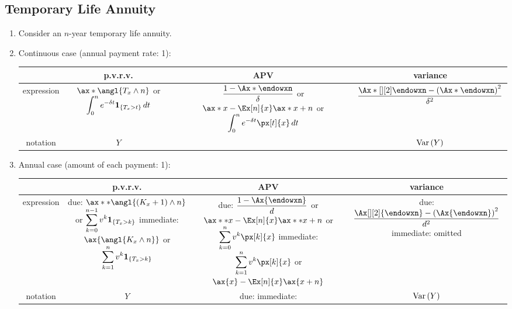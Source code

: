 \subsection{Temporary Life Annuity}
\begin{enumerate}
\item Consider an \(n\)-year temporary life annuity.
\item \label{it:cts-tmp-annuity-fmlas}
Continuous case (annual payment rate: 1):

\begin{tabular}{cccc}
\toprule
&p.v.r.v.&APV&variance\\
\midrule
expression&\(\ax*{\angl{T_x\wedge n}}\) or \(\displaystyle\int_{0}^{n}e^{-\delta t}\mathbf{1}_{\left\{T_x>t\right\}}\,dt\)
&\makecell{\(\displaystyle \frac{1-\Ax*{\endowxn}}{\delta}\) or 
\(\displaystyle \ax*{x}-\Ex[n]{x}\ax*{x+n}\)\\
or \(\displaystyle\int_{0}^{n}e^{-\delta t}\px[t]{x}\,dt\)}
&\(\displaystyle \frac{\Ax*[][2]{\endowxn}-\qty(\Ax*{\endowxn})^2}{\delta^2}\)\\
notation&\(Y\)&{\(\ax*{\endowxn}\)}&\(\operatorname{Var}\qty(Y)\)\\
\bottomrule
\end{tabular}
\item \label{it:ann-tmp-annuity-fmlas}
Annual case (amount of each payment: 1):

\begin{tabular}{cccc}
\toprule
&p.v.r.v.&APV&variance\\
\midrule
expression&
\makecell{
due: \(\ax**{\angl{\qty(K_x+1)\wedge n}}\) or \(\displaystyle\sum_{k=0}^{n-1}v^k\mathbf{1}_{\left\{T_x>k\right\}}\)\\
immediate: \(\ax{\angl{K_x\wedge n}}\) or \(\displaystyle\sum_{k=1}^{n}v^k\mathbf{1}_{\left\{T_x>k\right\}}\)
}
&\makecell{
due: \(\displaystyle \frac{1-\Ax{\endowxn}}{d}\) or \(\ax**{x}-\Ex[n]{x}\ax**{x+n}\) \\
or \(\displaystyle\sum_{k=0}^{n}v^k\px[k]{x}\)\\
immediate: \(\displaystyle\sum_{k=1}^{n}v^k\px[k]{x}\) \\
or \(\ax{x}-\Ex[n]{x}\ax{x+n}\) \\
}
&\makecell{due: \(\displaystyle \frac{\Ax[][2]{\endowxn}-\qty(\Ax{\endowxn})^2}{d^2}\)\\
immediate: omitted
}\\
notation&\(Y\)&
\makecell{due: \defn{\(\ax**{\endowxn}\)}\\
immediate: {\(\ax{\endowxn}\)}}&\(\operatorname{Var}\qty(Y)\)\\
\bottomrule
\end{tabular}


\end{enumerate}
